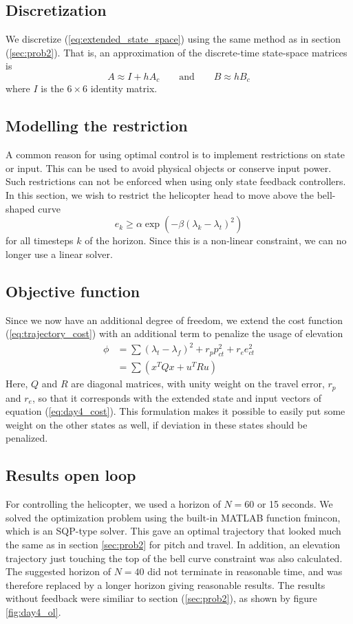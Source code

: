 \subsection{Discretization}
We discretize (\ref{eq:extended_state_space}) using the same method as in section (\ref{sec:prob2}). That is, an approximation of the discrete-time state-space matrices is
\begin{equation}
    A \approx I + hA_c
    \qquad\text{and}\qquad
    B \approx hB_c
\end{equation}
where $I$ is the $6\times6$ identity matrix.

\subsection{Modelling the restriction}
A common reason for using optimal control is to implement restrictions on state or input. This can be used to avoid physical objects or conserve input power. Such restrictions can not be enforced when using only state feedback controllers. In this section, we wish to restrict the helicopter head to move above the bell-shaped curve
\begin{equation}
    e_k \geq \alpha \exp (-\beta (\lambda_k - \lambda_t)^2 )
\end{equation}
for all timesteps $k$ of the horizon. Since this is a non-linear constraint, we can no longer use a linear solver.

\subsection{Objective function}
Since we now have an additional degree of freedom, we extend the cost function (\ref{eq:trajectory_cost}) with an additional term to penalize the usage of elevation
\begin{align}
    \phi &=\sum (\lambda_t - \lambda_f)^2 + r_{p}p_{ct}^2 + r_{e}e_{ct}^2 \\
         &=\sum(x^{T}Qx+u^{T}Ru)
\end{align}
Here, $Q$ and $R$ are diagonal matrices, with unity weight on the travel error, $r_p$ and $r_e$, so that it corresponds with the extended state and input vectors of equation (\ref{eq:day4_cost}). This formulation makes it possible to easily put some weight on the other states as well, if deviation in these states should be penalized.

\subsection{Results open loop}
For controlling the helicopter, we used a horizon of $N=60$ or 15 seconds. We solved the optimization problem using the built-in MATLAB function fmincon, which is an SQP-type solver. This gave an optimal trajectory that looked much the same as in section \ref{sec:prob2} for pitch and travel. In addition, an elevation trajectory just touching the top of the bell curve constraint was also calculated. The suggested horizon of $N=40$ did not terminate in reasonable time, and was therefore replaced by a longer horizon giving reasonable results. The results without feedback were similiar to section (\ref{sec:prob2}), as shown by figure \ref{fig:day4_ol}.

